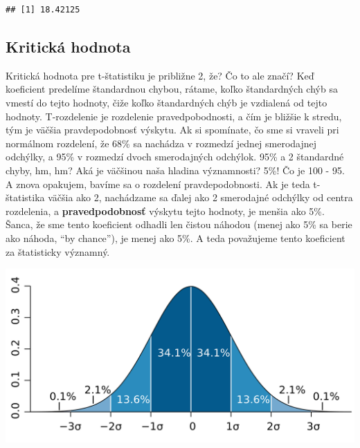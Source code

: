 \begin{Shaded}
\begin{Highlighting}[]
\StringTok{ }\OperatorTok{$}\NormalTok{coefficients[}\NormalTok{, }\NormalTok{] }\OperatorTok{/}\StringTok{ }
          \OperatorTok{$}\NormalTok{coefficients[}\NormalTok{, }\NormalTok{]}
\end{Highlighting}
\end{Shaded}

\begin{verbatim}
## [1] 18.42125
\end{verbatim}

\hypertarget{kritickuxe1-hodnota}{%
\subsection{Kritická hodnota}\label{kritickuxe1-hodnota}}

Kritická hodnota pre t-štatistiku je približne 2, že? Čo to ale značí?
Keď koeficient predelíme štandardnou chybou, rátame, koľko štandardných
chýb sa vmestí do tejto hodnoty, čiže koľko štandardných chýb je
vzdialená od tejto hodnoty. T-rozdelenie je rozdelenie pravedpobodnosti,
a čím je bližšie k stredu, tým je väčšia pravdepodobnosť výskytu. Ak si
spomínate, čo sme si vraveli pri normálnom rozdelení, že 68\% sa
nachádza v rozmedzí jednej smerodajnej odchýlky, a 95\% v rozmedzí dvoch
smerodajných odchýlok. 95\% a 2 štandardné chyby, hm, hm? Aká je
väčšinou naša hladina významnosti? 5\%! Čo je 100 - 95. A znova
opakujem, bavíme sa o rozdelení pravdepodobnosti. Ak je teda
t-štatistika väčšia ako 2, nachádzame sa ďalej ako 2 smerodajné odchýlky
od centra rozdelenia, a \textbf{pravedpodobnosť} výskytu tejto hodnoty,
je menšia ako 5\%. Šanca, že sme tento koeficient odhadli len čistou
náhodou (menej ako 5\% sa berie ako náhoda, ``by chance''), je menej ako
5\%. A teda považujeme tento koeficient za štatisticky významný.

\begin{center}

\includegraphics{diplomka obrazky/8.png}

\end{center}


